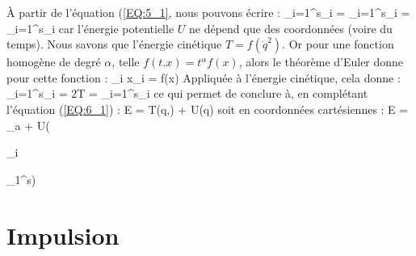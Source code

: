 \`A partir de l'\'equation (\ref{EQ:5_1}, nous pouvons \'ecrire :
\be
	\sum_{i=1}^{s}_{i} = \sum_{i=1}^{s}_{i} = \sum_{i=1}^{s}_{i}
\ee
car l'\'energie potentielle $U$ ne d\'epend que des coordonn\'ees (voire du temps).
Nous savons que l'\'energie cin\'etique $T = f(\dot{q}^{2})$. Or pour une fonction homog\`ene de degr\'e $\alpha$, telle $f(t.x) = t^{\alpha}f(x)$, alors le th\'eor\`eme d'Euler donne pour cette fonction :
\be
	\sum_{i} x_{i} = \alpha f(x)
\ee
Appliqu\'ee \`a l'\'energie cin\'etique, cela donne :
\be
	\sum_{i=1}^{s}_{i} = 2T = \sum_{i=1}^{s}_{i} \label{EQ:6_1_1}
\ee
ce qui permet de conclure \`a, en compl\'etant l'\'equation (\ref{EQ:6_1}) :
\be
	E = T(q,) + U(q) \label{EQ:6_2}
\ee
soit en coordonn\'ees cart\'esiennes :
\be
	E = \sum_{a} + U(\begin{Bmatrix}_{i}\end{Bmatrix}_{1}^{s}) \label{EQ:6_3}
\ee

\section{Impulsion}


